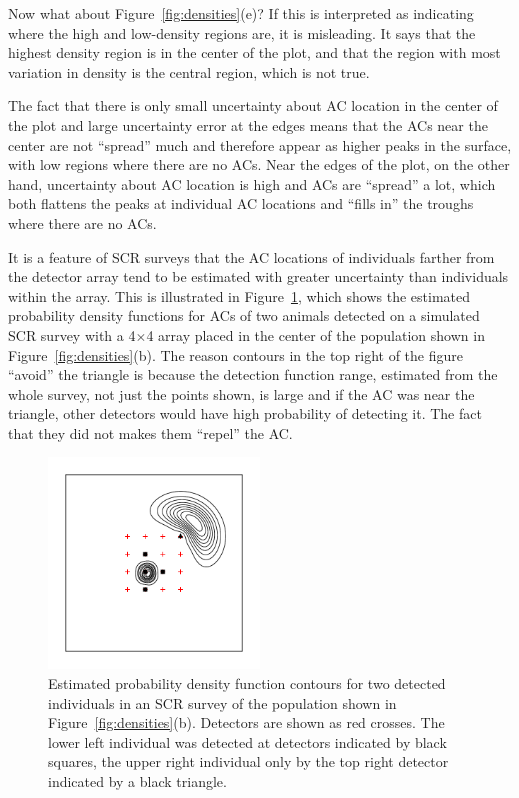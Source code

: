 \documentclass[useAMS,usenatbib,referee]{biom}
\begin{document}
Now what about Figure~\ref{fig:densities}(e)? If this is interpreted as indicating where the high and low-density regions are, it is misleading. It says that the highest density region is in the center of the plot, and that the region with most variation in density is the central region, which is not true. 

The fact that there is only small uncertainty about AC location in the center of the plot and large uncertainty error at the edges means that the ACs near the center are not ``spread'' much and therefore appear as higher peaks in the surface, with low regions where there are no ACs. Near the edges of the plot, on the other hand, uncertainty about AC location is high and ACs are ``spread'' a lot, which both flattens the peaks at individual AC locations and ``fills in'' the troughs where there are no ACs. 

It is a feature of SCR surveys that the AC locations of individuals farther from the detector array tend to be estimated with greater uncertainty than individuals within the array. This is illustrated in Figure~\ref{fig:screrr}, which shows the estimated probability density functions for ACs of two animals detected on a simulated SCR survey with a 4$\times$4 array placed in the center of the population shown in Figure~\ref{fig:densities}(b). The reason contours in the top right of the figure ``avoid'' the triangle is because the detection function range, estimated from the whole survey, not just the points shown, is large and if the AC was near the triangle, other detectors would have high probability of detecting it. The fact that they did not makes them ``repel'' the AC. 

\begin{figure}[htbp]
\centering
\includegraphics[width=0.5\textwidth]{screrr.pdf}
\caption{Estimated probability density function contours for two detected individuals in an SCR survey of the population shown in Figure~\ref{fig:densities}(b). Detectors are shown as red crosses. The lower left individual was detected at detectors indicated by black squares, the upper right individual only by the top right detector indicated by a black triangle.}
\label{fig:screrr}
\end{figure}
\end{document}
